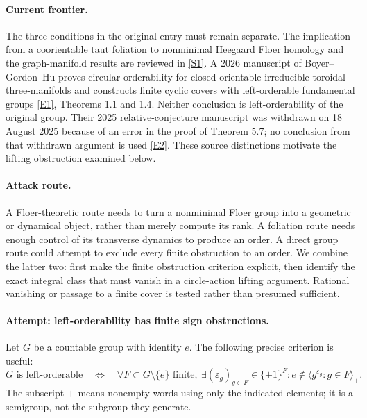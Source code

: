 \documentclass[11pt,a4paper]{article}
\newcommand{\eps}{\varepsilon}
\newcommand{\sref}[2]{\hyperlink{source:#1:#2}{[S#2]}}
\newcommand{\eref}[2]{\hyperlink{extra:#1:#2}{[E#2]}}
\numberwithin{equation}{section}
\begin{document}
\paragraph{Current frontier.}
The three conditions in the original entry must remain separate. The
implication from a coorientable taut foliation to nonminimal Heegaard Floer
homology and the graph-manifold results are reviewed in \sref{181}{1}.
A 2026 manuscript of Boyer--Gordon--Hu proves circular orderability for
closed orientable irreducible toroidal three-manifolds and constructs
finite cyclic covers with left-orderable fundamental groups
\eref{181}{1}, Theorems 1.1 and 1.4. Neither conclusion is left-orderability
of the original group. Their 2025 relative-conjecture manuscript was
withdrawn on 18 August 2025 because of an error in the proof of Theorem 5.7;
no conclusion from that withdrawn argument is used \eref{181}{2}.
These source distinctions motivate the lifting obstruction examined below.

\paragraph{Attack route.}
A Floer-theoretic route needs to turn a nonminimal Floer group into a
geometric or dynamical object, rather than merely compute its rank. A
foliation route needs enough control of its transverse dynamics to produce
an order. A direct group route could attempt to exclude every finite
obstruction to an order. We combine the latter two: first make the finite
obstruction criterion explicit, then identify the exact integral class
that must vanish in a circle-action lifting argument. Rational vanishing
or passage to a finite cover is tested rather than presumed sufficient.

\paragraph{Attempt: left-orderability has finite sign obstructions.}
Let $G$ be a countable group with identity $e$. The following precise
criterion is useful:
\begin{equation}\label{eq181-signs}
 G\text{ is left-orderable}\quad\Longleftrightarrow\quad
 \forall F\subset G\setminus\{e\}\text{ finite},\ \exists
 (\eps_g)_{g\in F}\in\{\pm1\}^{F}:
 e\notin\langle g^{\eps_g}:g\in F\rangle_+.
\end{equation}
The subscript $+$ means nonempty words using only the indicated elements;
it is a semigroup, not the subgroup they generate.
\end{document}
